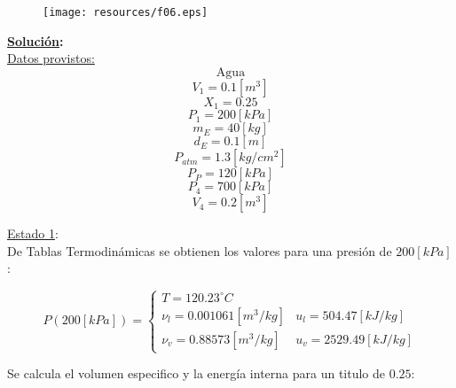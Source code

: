 \documentclass[letter,11pt]{article}
\begin{document}
\begin{enumerate}
\begin{figure}[H]
\centering
\texttt{[image: resources/f06.eps]}
\end{figure}

\textbf{\underline{Solución}:} \\

\underline{Datos provistos:}
\begin{equation*}
    \text{Agua}
\end{equation*}
\begin{equation*}
    V_1 = 0.1[m^3]
\end{equation*}
\begin{equation*}
    X_1 = 0.25
\end{equation*}
\begin{equation*}
    P_1 = 200[kPa]
\end{equation*}
\begin{equation*}
    m_E = 40[kg]
\end{equation*}
\begin{equation*}
    d_E = 0.1[m]
\end{equation*}
\begin{equation*}
    P_{atm} = 1.3[kg/cm^2]
\end{equation*}
\begin{equation*}
    P_P = 120[kPa]
\end{equation*}
\begin{equation*}
    P_4 = 700[kPa]
\end{equation*}
\begin{equation*}
    V_4 = 0.2[m^3]
\end{equation*}

\underline{Estado 1}: \\
De Tablas Termodinámicas se obtienen los valores para una presión de $200[kPa]$:

\begin{equation*}
    P(200[kPa]) = \begin{cases}
        T = 120.23^\circ C \\
        \nu_l = 0.001061[m^3/kg] & u_l = 504.47[kJ/kg] \\
        \nu_v = 0.88573[m^3/kg]  & u_v = 2529.49[kJ/kg]
    \end{cases}
\end{equation*}

Se calcula el volumen especifico y la energía interna para un titulo de $0.25$:


\end{enumerate}
\end{document}
